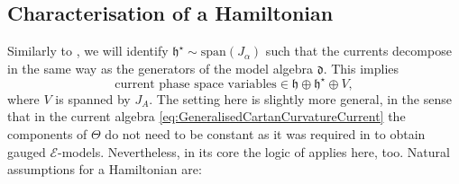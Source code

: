 \documentclass[11pt,a4paper]{article}
\numberwithin{equation}{section}
\begin{document}
\subsection{Characterisation of a Hamiltonian}
Similarly to \cite{Lacroix:2023ybi}, we will identify $\mathfrak{h}^\star \sim \text{span}(J_\alpha)$ such that the currents decompose in the same way as the generators of the model algebra $\mathfrak{d}$. This implies
\begin{equation}
	\text{current phase space variables} \in \mathfrak{h} \oplus \mathfrak{h}^\star \oplus V,
\end{equation}
where $V$ is spanned by $J_A$. The setting here is slightly more general, in the sense that in the current algebra \eqref{eq:GeneralisedCartanCurvatureCurrent} the components of $\Theta$ do not need to be constant as it was required in  \cite{Lacroix:2023ybi} to obtain gauged $\mathcal{E}$-models. Nevertheless, in its core the logic of \cite{Lacroix:2023ybi} applies here, too. Natural assumptions for a Hamiltonian are:
\end{document}
